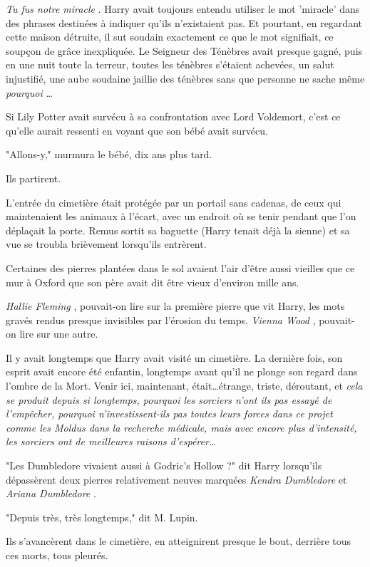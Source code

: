 \emph{Tu fus notre miracle} . Harry avait toujours entendu utiliser le mot 'miracle' dans des phrases destinées à indiquer qu'ils n'existaient pas. Et pourtant, en regardant cette maison détruite, il sut soudain exactement ce que le mot signifiait, ce soupçon de grâce inexpliquée. Le Seigneur des Ténèbres avait presque gagné, puis en une nuit toute la terreur, toutes les ténèbres s'étaient achevées, un salut injustifié, une aube soudaine jaillie des ténèbres sans que personne ne sache même \emph{pourquoi} …

Si Lily Potter avait survécu à sa confrontation avec Lord Voldemort, c'est ce qu'elle aurait ressenti en voyant que son bébé avait survécu.

"Allons-y," murmura le bébé, dix ans plus tard.

Ils partirent.

L'entrée du cimetière était protégée par un portail sans cadenas, de ceux qui maintenaient les animaux à l'écart, avec un endroit où se tenir pendant que l'on déplaçait la porte. Remus sortit sa baguette (Harry tenait déjà la sienne) et sa vue se troubla brièvement lorsqu'ils entrèrent.

Certaines des pierres plantées dans le sol avaient l'air d'être aussi vieilles que ce mur à Oxford que son père avait dit être vieux d'environ mille ans.

\emph{Hallie Fleming} , pouvait-on lire sur la première pierre que vit Harry, les mots gravés rendus presque invisibles par l'érosion du temps. \emph{Vienna Wood} , pouvait-on lire sur une autre.

Il y avait longtemps que Harry avait visité un cimetière. La dernière fois, son esprit avait encore été enfantin, longtemps avant qu'il ne plonge son regard dans l'ombre de la Mort. Venir ici, maintenant, était…étrange, triste, déroutant, et \emph{cela se produit depuis si longtemps, pourquoi les sorciers n'ont ils pas essayé de l'empêcher, pourquoi n'investissent-ils pas toutes leurs forces dans ce projet comme les Moldus dans la recherche médicale, mais avec encore plus d'intensité, les sorciers ont de meilleures raisons d'espérer…} 

"Les Dumbledore vivaient aussi à Godric's Hollow ?" dit Harry lorsqu'ils dépassèrent deux pierres relativement neuves marquées \emph{Kendra Dumbledore}  et \emph{Ariana Dumbledore} .

"Depuis très, très longtemps," dit M. Lupin.

Ils s'avancèrent dans le cimetière, en atteignirent presque le bout, derrière tous ces morts, tous pleurés.

